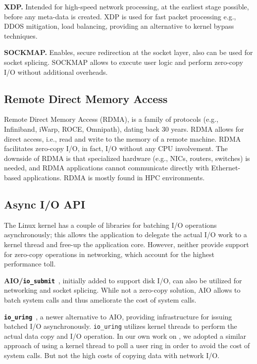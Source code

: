 \noindent \textbf{XDP\cite{xdp}.} Intended for high-speed network processing, at the earliest stage possible, before any meta-data is created. XDP is used for fast packet processing e.g., DDOS mitigation, load balancing, providing an alternative to kernel bypass techniques. 


\noindent \textbf{SOCKMAP\cite{sockmap}.} Enables, secure redirection at the socket layer, also can be used for socket splicing\cite{cloudflare_sockmap}. SOCKMAP allows to execute user logic and perform zero-copy I/O without additional overheads.

\subsection{Remote Direct Memory Access}
Remote Direct Memory Access (RDMA), is a family of protocols (e.g., Infiniband\cite{infiniband}, iWarp\cite{iwarp}, ROCE\cite{roce}, Omnipath\cite{omnipath}), dating back 30 years. RDMA allows for direct access, i.e., read and write to the memory of a remote machine. RDMA facilitates zero-copy I/O, in fact, I/O without any CPU involvement. The downside of RDMA is that specialized hardware (e.g., NICs, routers, switches) is needed, and RDMA applications cannot communicate directly with Ethernet-based applications. RDMA is mostly found in HPC environments\cite{top500}.

\subsection{Async I/O API}
The Linux kernel has a couple of libraries for batching I/O operations asynchronously; this allows the application to delegate the actual I/O work to a kernel thread and free-up the application core.
However, neither provide support for zero-copy operations in networking, which account for the highest performance toll.

\noindent \textbf{AIO/\texttt{io\_submit}}~\cite{aio}, initially added to support disk I/O, can also be utilized for networking and socket splicing\cite{cloudflare_aio}. While not a zero-copy solution, AIO allows to batch system calls and thus ameliorate the cost of system calls.

\noindent \textbf{\texttt{io\_uring}}~\cite{io-uring}, a newer alternative to AIO, providing infrastructure for issuing batched I/O asynchronously. \texttt{io\_uring} utilizes kernel threads to perform the actual data copy and I/O operation. In our own work on \oursys, we adopted a similar approach of using a kernel thread to poll a user ring in order to avoid the cost of system calls. But not the high costs of copying data with network I/O.

